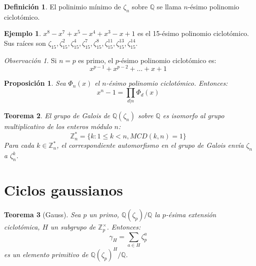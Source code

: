 \documentclass{report}
\newtheorem{theorem}{Teorema}[chapter]
\newtheorem{proposition}[theorem]{Proposición}
\theoremstyle{remark}
\newtheorem*{remark}{Observación}
\theoremstyle{definition}
\newtheorem{definition}{Definición}[chapter]
\theoremstyle{definition}
\theoremstyle{definition}
\newtheorem*{example}{Ejemplo}
\begin{document}
\begin{definition}
    El polinimio mínimo de $\zeta_n$ sobre $\mathbb{Q}$ se llama $n$-ésimo polinomio ciclotómico.
\end{definition}

\begin{example}
    $x^8-x^7+x^5-x^4+x^3-x+1$ es el 15-ésimo polinomio ciclotómico.\\
    Sus raíces son $\zeta_{15}, \zeta^2_{15}, \zeta^4_{15}, \zeta^7_{15}, \zeta^8_{15}, \zeta^{11}_{15}, \zeta^{13}_{15}, \zeta^{14}_{15}$.
\end{example}

\begin{remark}
    Si $n = p$ es primo, el $p$-ésimo polinomio ciclotómico es:
    $$x^{p-1} + x^{p-2} + \dots + x + 1$$
\end{remark}

\begin{proposition}
    Sea $\Phi_n(x)$ el $n$-ésimo polinomio ciclotómico. Entonces:
    $$x^n-1 = \prod_{d | n} \Phi_d(x)$$
\end{proposition}

\begin{theorem}
    El grupo de Galois de $\mathbb{Q}(\zeta_n)$ sobre $\mathbb{Q}$ es isomorfo al grupo multiplicativo de los enteros módulo $n$:
    $$\mathbb{Z}^*_n = \{ k : 1 \leq k < n, MCD(k, n) = 1 \}$$
    Para cada $k \in \mathbb{Z}^*_n$, el correspondiente automorfismo en el grupo de Galois envía $\zeta_n$ a $\zeta^k_n$.
\end{theorem}

\section{Ciclos gaussianos}

\begin{theorem}[Gauss]
    Sea $p$ un primo, $\mathbb{Q}(\zeta_p)/\mathbb{Q}$ la $p$-ésima extensión ciclotómica, $H$ un subgrupo de $\mathbb{Z}^\times_p$. Entonces:
    $$\gamma_H = \sum_{a \in H} \zeta^a_p$$
    es un elemento primitivo de $\mathbb{Q}(\zeta_p)^H/\mathbb{Q}$.
\end{theorem}
\end{document}
